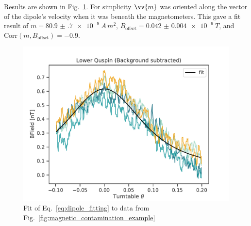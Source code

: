 Results are shown in Fig.~\ref{fig:lower_quspin_contamination_fit}. For simplicity $\vv{m}$ was oriented along the vector of the dipole's velocity when it was beneath the magnetometers. This gave a fit result of $m=\qty{80.9(7)e-9}{A\,m^2}$, $B_\text{offset}=\qty{0.042(4)e-9}{T}$, and $\text{Corr}(m, B_\text{offset})=-0.9$.


\begin{figure}
    \centering
    \includegraphics[width=0.7 \textwidth]{figures/quspin_fit.pdf}
    \caption
    {Fit of Eq.~\ref{eq:dipole_fitting} to data from Fig.~\ref{fig:magnetic_contamination_example}}
    \label{fig:lower_quspin_contamination_fit}
\end{figure}